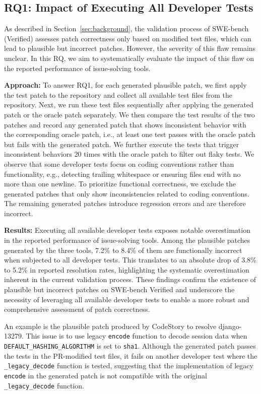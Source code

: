 \subsection{RQ1: Impact of Executing All Developer Tests}
As described in Section~\ref{sec:background}, the validation process of SWE-bench (Verified) assesses patch correctness only based on modified test files, which can lead to plausible but incorrect patches.
However, the severity of this flaw remains unclear. 
In this RQ, we aim to systematically evaluate the impact of this flaw on the reported performance of issue-solving tools.

\noindent \textbf{Approach:}
To answer RQ1, for each generated plausible patch,  we first apply the test patch to the repository and collect all available test files from the repository.
Next, we run these test files sequentially after applying the generated patch or the oracle patch separately. 
We then compare the test results of the two patches and record any generated patch that shows inconsistent behavior with the corresponding oracle patch, i.e., at least one test passes with the oracle patch but fails with the generated patch.
We further execute the tests that trigger inconsistent behaviors 20 times with the oracle patch to filter out flaky tests.
We observe that some developer tests focus on coding conventions rather than functionality, e.g., detecting trailing whitespace or ensuring files end with no more than one newline.
To prioritize functional correctness, we exclude the generated patches that only show inconsistencies related to coding conventions. 
The remaining generated patches introduce regression errors and are therefore incorrect.



\noindent \textbf{Results:}
Executing all available developer tests exposes notable overestimation in the reported performance of issue-solving tools. 
Among the plausible patches generated by the three tools, 7.2\% to 8.4\% of them are functionally incorrect when subjected to all developer tests. 
This translates to an absolute drop of 3.8\% to 5.2\% in reported resolution rates, highlighting the systematic overestimation inherent in the current validation process. 
These findings confirm the existence of plausible but incorrect patches on SWE-bench Verified and underscore the necessity of leveraging all available developer tests to enable a more robust and comprehensive assessment of patch correctness.

%
%
An example is the plausible patch produced by CodeStory to resolve django-13279. 
This issue is to use legacy \verb|encode| function to decode session data when \verb|DEFAULT_HASHING_ALGORITHM| is set to \verb|sha1|. 
Although the generated patch passes the tests in the PR-modified test files, 
it fails on another developer test where the \verb|_legacy_decode| function is tested, 
suggesting that the implementation of legacy \verb|encode| in the generated patch is not compatible with the original \verb|_legacy_decode| function. 

